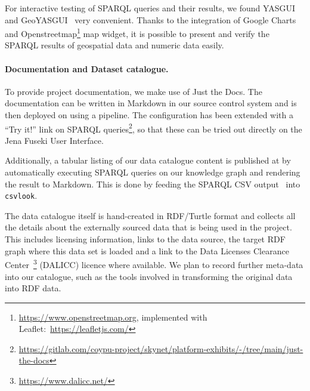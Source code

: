\documentclass[
hf
]{ceurart}
\begin{document}
For interactive testing of SPARQL queries and their results, we found YASGUI~\cite{rietveld2017yasgui} and GeoYASGUI~\cite{beek2017geoyasgui} very convenient. Thanks to the integration of Google Charts and Openstreetmap\footnote{\url{https://www.openstreetmap.org}, implemented with Leaflet:~\url{https://leafletjs.com/}} map widget, it is possible to present and verify the SPARQL results of geospatial data and numeric data easily.

\paragraph{Documentation and Dataset catalogue.}\label{para:docs}

To provide project documentation, we make use of Just the Docs. The documentation can be written in Markdown in our source control system and is then deployed on  using a pipeline. The configuration has been extended with a ``Try it!'' link on SPARQL queries\footnote{\url{https://gitlab.com/coypu-project/skynet/platform-exhibits/-/tree/main/just-the-docs}}, so that these can be tried out directly on the Jena Fuseki User Interface.

Additionally, a tabular listing of our data catalogue content is published at  by automatically executing SPARQL queries on our knowledge graph and rendering the result to Markdown. This is done by feeding the SPARQL CSV output~\cite{seaborne2013csv} into \texttt{csvlook}.

The data catalogue itself is hand-created in RDF/Turtle format and collects all the details about the externally sourced data that is being used in the \CoyPu project. This includes licensing information, links to the data source, the target RDF graph where this data set is loaded and a link to the Data Licenses Clearance Center~\cite{pellegrini2018automated}\footnote{\url{https://www.dalicc.net/}} (DALICC) licence where available. We plan to record further meta-data into our catalogue, such as the tools involved in transforming the original data into RDF data.

\end{document}
